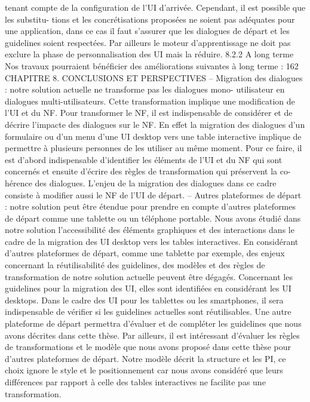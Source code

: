 \documentclass{article}
\begin{document}
tenant compte de la conﬁguration de l’UI d’arrivée. Cependant, il est possible que les substitu-
tions et les concrétisations proposées ne soient pas adéquates pour une application, dans ce cas
il faut s’assurer que les dialogues de départ et les guidelines soient respectées. Par ailleurs le
moteur d’apprentissage ne doit pas exclure la phase de personnalisation des UI mais la réduire.
8.2.2
A long terme
Nos travaux pourraient bénéﬁcier des améliorations suivantes à long terme :
162
CHAPITRE 8. CONCLUSIONS ET PERSPECTIVES
– Migration des dialogues : notre solution actuelle ne transforme pas les dialogues mono-
utilisateur en dialogues multi-utilisateurs. Cette transformation implique une modiﬁcation de
l’UI et du NF. Pour transformer le NF, il est indispensable de considérer et de décrire l’impacte
des dialogues sur le NF. En effet la migration des dialogues d’un formulaire ou d’un menu d’une
UI desktop vers une table interactive implique de permettre à plusieurs personnes de les utiliser
au même moment. Pour ce faire, il est d’abord indispensable d’identiﬁer les éléments de l’UI et
du NF qui sont concernés et ensuite d’écrire des règles de transformation qui préservent la co-
hérence des dialogues. L’enjeu de la migration des dialogues dans ce cadre consiste à modiﬁer
aussi le NF de l’UI de départ.
– Autres plateformes de départ : notre solution peut être étendue pour prendre en compte
d’autres plateformes de départ comme une tablette ou un téléphone portable. Nous avons étudié
dans notre solution l’accessibilité des éléments graphiques et des interactions dans le cadre de
la migration des UI desktop vers les tables interactives. En considérant d’autres plateformes de
départ, comme une tablette par exemple, des enjeux concernant la réutilisabilité des guidelines,
des modèles et des règles de transformation de notre solution actuelle peuvent être dégagés.
Concernant les guidelines pour la migration des UI, elles sont identiﬁées en considérant les UI
desktops. Dans le cadre des UI pour les tablettes ou les smartphones, il sera indispensable de
vériﬁer si les guidelines actuelles sont réutilisables. Une autre plateforme de départ permettra
d’évaluer et de compléter les guidelines que nous avons décrites dans cette thèse.
Par ailleurs, il est intéressant d’évaluer les règles de transformations et le modèle que nous
avons proposé dans cette thèse pour d’autres plateformes de départ. Notre modèle décrit la
structure et les PI, ce choix ignore le style et le positionnement car nous avons considéré que
leurs différences par rapport à celle des tables interactives ne facilite pas une transformation.
\end{document}
